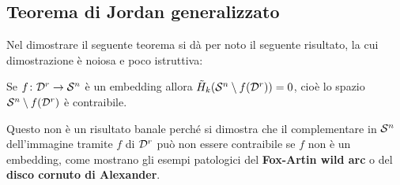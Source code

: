 \subsection{Teorema di Jordan generalizzato}

Nel dimostrare il seguente teorema si dà per noto il seguente risultato, la cui
dimostrazione è noiosa e poco istruttiva:
\begin{lemma}
  Se $ f \colon \mathcal{D}^{r} \to \mathcal{S}^{n} $ è un embedding allora
  $ \tilde{H}_k(\mathcal{S}^{n} \setminus f(\mathcal{D}^{r})) = 0 $, cioè lo spazio
  $ \mathcal{S}^{n} \setminus f(\mathcal{D}^{r}) $ è contraibile.
\end{lemma}
\begin{osservation}
  Questo non è un risultato banale perché si dimostra che il complementare in
  $ \mathcal{S}^{n} $ dell'immagine tramite $ f $ di $ \mathcal{D}^{r} $ può non essere
  contraibile se $ f $ non è un embedding, come mostrano gli esempi patologici
  del \textbf{Fox-Artin wild arc} o del \textbf{disco
    cornuto di Alexander}.
\end{osservation}

